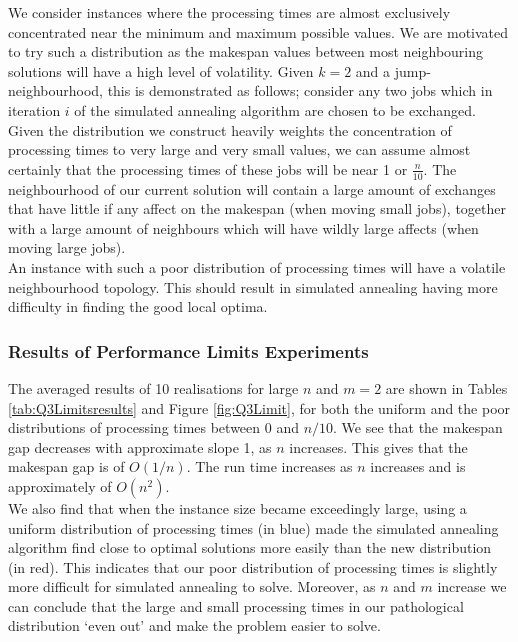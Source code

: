 \documentclass[12pt,a4paper,reqno]{article}
\begin{document}
We consider instances where the processing times are almost exclusively concentrated near the minimum and maximum possible values. We are motivated to try such a distribution as the makespan values between most neighbouring solutions will have a high level of volatility. Given $k=2$ and a jump-neighbourhood, this is demonstrated as follows; consider any two jobs which in iteration $i$ of the simulated annealing algorithm are chosen to be exchanged. Given the distribution we construct heavily weights the concentration of processing times to very large and very small values, we can assume almost certainly that the processing times of these jobs will be near 1 or $\frac{n}{10}$. The neighbourhood of our current solution will contain a large amount of exchanges that have little if any affect on the makespan (when moving small jobs), together with a large amount of neighbours which will have wildly large affects (when moving large jobs). \\

An instance with such a poor distribution of processing times will have a volatile neighbourhood topology. This should result in simulated annealing having more difficulty in finding the good local optima.

\subsubsection{Results of Performance Limits Experiments}
The averaged results of 10 realisations for large $n$ and $m=2$ are shown in Tables \ref{tab:Q3Limitsresults} and Figure \ref{fig:Q3Limit}, for both the uniform and the poor distributions of processing times between 0 and $n/10$. We see that the makespan gap decreases with approximate slope 1, as $n$ increases. This gives that the makespan gap is of $O(1/n)$. The run time increases as $n$ increases and is approximately of $O(n^2)$. \\

We also find that when the instance size became exceedingly large, using a uniform distribution of processing times (in blue) made the simulated annealing algorithm find close to optimal solutions more easily than the new distribution (in red). This indicates that our poor distribution of processing times is slightly more difficult for simulated annealing to solve. Moreover, as $n$ and $m$ increase we can conclude that the large and small processing times in our pathological distribution `even out' and make the problem easier to solve.
\end{document}
